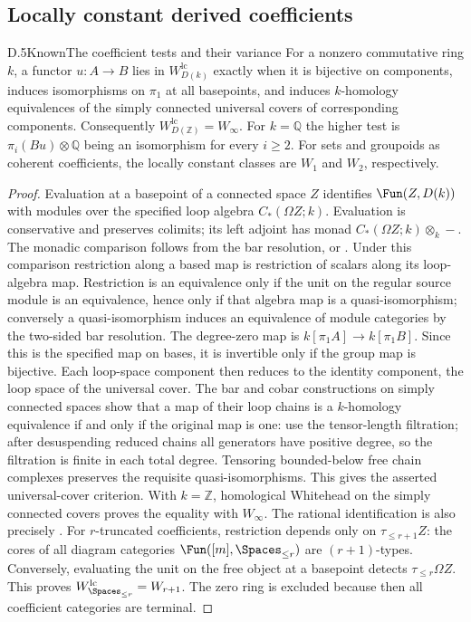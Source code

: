\subsection{Locally constant derived coefficients}
\begin{claim}{D.5}{Known}{The coefficient tests and their variance}
For a nonzero commutative ring $k$, a functor $u:A\to B$ lies in $W_{D(k)}^{\mathrm{lc}}$ exactly when it is bijective on components, induces isomorphisms on $\pi_1$ at all basepoints, and induces $k$-homology equivalences of the simply connected universal covers of corresponding components. Consequently $W_{D(\mathbb Z)}^{\mathrm{lc}}=W_\infty$. For $k=\mathbb Q$ the higher test is $\pi_i(Bu)\otimes\mathbb Q$ being an isomorphism for every $i\geq2$. For sets and groupoids as coherent coefficients, the locally constant classes are $W_1$ and $W_2$, respectively.
\end{claim}
\begin{proof}
Evaluation at a basepoint of a connected space $Z$ identifies $\Fun(Z,D(k))$ with modules over the specified loop algebra $C_*(\Omega Z;k)$. Evaluation is conservative and preserves colimits; its left adjoint has monad $C_*(\Omega Z;k)\otimes_k-$. The monadic comparison follows from the bar resolution, or \citet[Theorem 4.7.3.5]{RLurieHA}. Under this comparison restriction along a based map is restriction of scalars along its loop-algebra map. Restriction is an equivalence only if the unit on the regular source module is an equivalence, hence only if that algebra map is a quasi-isomorphism; conversely a quasi-isomorphism induces an equivalence of module categories by the two-sided bar resolution.
The degree-zero map is $k[\pi_1A]\to k[\pi_1B]$. Since this is the specified map on bases, it is invertible only if the group map is bijective. Each loop-space component then reduces to the identity component, the loop space of the universal cover. The bar and cobar constructions on simply connected spaces show that a map of their loop chains is a $k$-homology equivalence if and only if the original map is one: use the tensor-length filtration; after desuspending reduced chains all generators have positive degree, so the filtration is finite in each total degree. Tensoring bounded-below free chain complexes preserves the requisite quasi-isomorphisms. This gives the asserted universal-cover criterion. With $k=\mathbb Z$, homological Whitehead on the simply connected covers proves the equality with $W_\infty$. The rational identification is also precisely \citet[Theorem 3]{RRivera2021}.
For $r$-truncated coefficients, restriction depends only on $\tau_{\leq r+1}Z$: the cores of all diagram categories $\Fun([m],\Spaces_{\leq r})$ are $(r+1)$-types. Conversely, evaluating the unit on the free object at a basepoint detects $\tau_{\leq r}\Omega Z$. This proves $W^{\mathrm{lc}}_{\Spaces_{\leq r}}=W_{r+1}$. The zero ring is excluded because then all coefficient categories are terminal.
\end{proof}

